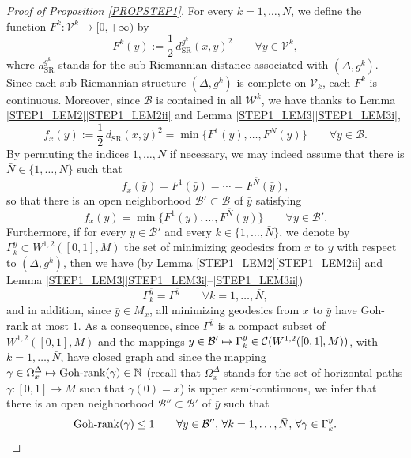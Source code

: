 \documentclass[JEP,XML,SOM,Unicode,NoFloatCountersInSection,published]{cedram}
\newcommand\mto{\mathchoice{\longmapsto}{\mapsto}{\mapsto}{\mapsto}}
\newcommand{\SR}{{\scriptscriptstyle\mathrm{SR}}}
\DeclareMathOperator{\Gohrank}{Goh\textup{-}rank}
\newcommand\N{\mathbb N}
\theoremstyle{definition}
\begin{document}
\begin{proof}[Proof of Proposition \ref{PROPSTEP1}]
For every $k=1, \ldots,N$, we define the function $F^k:\mathcal{V}^k \to [0,+\infty)$ by
\[
F^k(y):= \frac{1}{2}\, d_{\SR}^{g^k}(x,y)^2 \qquad \forall y \in \mathcal{V}^k,
\]
where $d_{\SR}^{g^k}$ stands for the sub-Riemannian distance associated with $(\Delta,g^k)$. Since each sub-Riemannian structure $(\Delta,g^k)$ is complete on $\mathcal{V}_k$, each $F^k$ is continuous. Moreover, since $\mathcal{B}$ is contained in all $\mathcal{W}^k$, we have thanks to Lemma \ref{STEP1_LEM2}\eqref{STEP1_LEM2ii} and Lemma \ref{STEP1_LEM3}\eqref{STEP1_LEM3i},
\[
f_x(y) := \frac{1}{2}\, d_{\SR}(x,y)^2 = \min \bigl\{ F^1(y), \ldots, F^N(y) \bigr\} \qquad \forall y \in \mathcal{B}.
\]
By permuting the indices $1, \ldots, N$ if necessary, we may indeed assume that there is $\bar{N} \in \{1, \ldots, N\}$ such that
\[
f_x(\bar{y}) = F^1(\bar{y})= \cdots = F^{\bar{N}}(\bar{y}),
\]
so that there is an open neighborhood $\mathcal{B}'\subset \mathcal{B}$ of $\bar{y}$ satisfying
\[
f_x(y)= \min \bigl\{ F^1(y), \ldots, F^{\bar{N}}(y) \bigr\} \qquad \forall y \in \mathcal{B}'.
\]
Furthermore, if for every $y\in \mathcal{B}'$ and every $k\in \{1,\ldots, \bar{N}\}$, we denote by $\Gamma^y_k \subset W^{1,2}([0,1],M)$ the set of minimizing geodesics from $x$ to $y$ with respect to $(\Delta,g^k)$, then we have (by Lemma \ref{STEP1_LEM2}\eqref{STEP1_LEM2ii} and Lemma \ref{STEP1_LEM3}\eqref{STEP1_LEM3i}--\eqref{STEP1_LEM3ii})
\[
\Gamma^{\bar{y}}_k = \Gamma^{\bar{y}} \qquad \forall k=1, \ldots, \bar{N},
\]
and in addition, since $\bar{y}\in M_x$, all minimizing geodesics from $x$ to $\bar{y}$ have Goh-rank at most $1$. As a consequence, since $\Gamma^{\bar{y}}$ is a compact subset of $W^{1,2}([0,1],M)$ and the mappings $y\in \mathcal{B}' \mto \Gamma^y_k \in \mathcal{C}(W^{1,2}([0,1],M))$, with $k=1, \ldots, \bar{N}$, have closed graph and since the mapping $\gamma \in \Omega^{\Delta}_x \mto \Gohrank(\gamma)\in \N$ (recall that $\Omega^{\Delta}_x$ stands for the set of horizontal paths $\gamma:[0,1] \to M$ such that $\gamma(0)=x$) is upper semi-continuous, we infer that there is an open neighborhood $\mathcal{B}''\subset \mathcal{B}'$ of $\bar{y}$ such that
\[
\Gohrank(\gamma)\leq 1 \qquad \forall y \in \mathcal{B}'', \, \forall k=1, \ldots,\bar{N}, \, \forall \gamma \in \Gamma^{y}_k.
\]

\end{proof}
\end{document}
